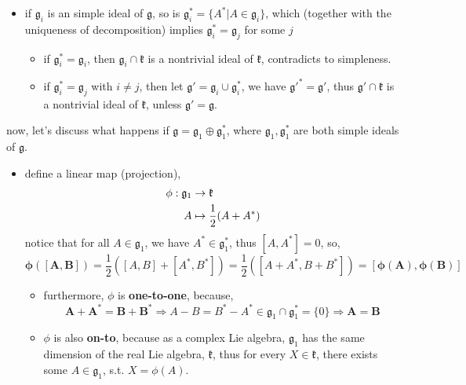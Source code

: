 \begin{itemize}
\begin{tcolorbox}[title=proof:]
\begin{itemize}
			\item if $\mathfrak{g}_i$ is an simple ideal of $\mathfrak{g}$, so is $\mathfrak{g}_i^* = \{A^* | A \in \mathfrak{g}_i\}$, which (together with the uniqueness of decomposition) implies $\mathfrak{g}_i^* = \mathfrak{g}_j$ for some $j$
			\begin{itemize}
				\item if $\mathfrak{g}_i^* = \mathfrak{g}_i$, then $\mathfrak{g}_i \cap \mathfrak{k}$ is a nontrivial ideal of $\mathfrak{k}$, contradicts to simpleness.
				
				\item if $\mathfrak{g}_i^* = \mathfrak{g}_j$ with $i \neq j$, then let $\mathfrak{g}' = \mathfrak{g}_i \cup \mathfrak{g}_i^*$, we have $\mathfrak{g}'^* = \mathfrak{g}'$, thus $\mathfrak{g}' \cap \mathfrak{k}$ is a nontrivial ideal of $\mathfrak{k}$, unless $\mathfrak{g}' = \mathfrak{g}$.
			\end{itemize}
		\end{itemize}
		
		now, let's discuss what happens if $\mathfrak{g} = \mathfrak{g}_1 \oplus \mathfrak{g}_1^*$, where $\mathfrak{g}_1, \mathfrak{g}_1^*$ are both simple ideals of $\mathfrak{g}$.
		\begin{itemize}
			\item define a linear map (projection),
			\begin{align}
				\phi : \mathfrak{g}_1 & \rightarrow \mathfrak{k} \notag \\
				A & \mapsto \frac{1}{2} (A + A^*)
			\end{align}
			notice that for all $A \in \mathfrak{g}_1$, we have $A^* \in \mathfrak{g}_1^*$, thus $[A, A^*] = 0$, so,
			\begin{equation}
				\boldsymbol{\phi([A, B])} = \frac{1}{2} ([A, B] + [A^*, B^*]) = \frac{1}{2} ([A + A^*, B + B^*]) \boldsymbol{= [\phi(A), \phi(B)]}
			\end{equation}
			\begin{itemize}
				\item furthermore, $\phi$ is \textbf{one-to-one}, because,
				\begin{equation}
					\boldsymbol{A + A^* = B + B^*} \Longrightarrow A - B = B^* - A^* \in \mathfrak{g}_1 \cap \mathfrak{g}_1^* = \{0\} \boldsymbol{\Longrightarrow A = B}
				\end{equation}
				
				\item $\phi$ is also \textbf{on-to}, because as a complex Lie algebra, $\mathfrak{g}_1$ has the same dimension of the real Lie algebra, $\mathfrak{k}$, thus for every $X \in \mathfrak{k}$, there exists some $A \in \mathfrak{g}_1$, s.t. $X = \phi(A)$.
			\end{itemize}
			

\end{itemize}
\end{tcolorbox}
\end{itemize}
